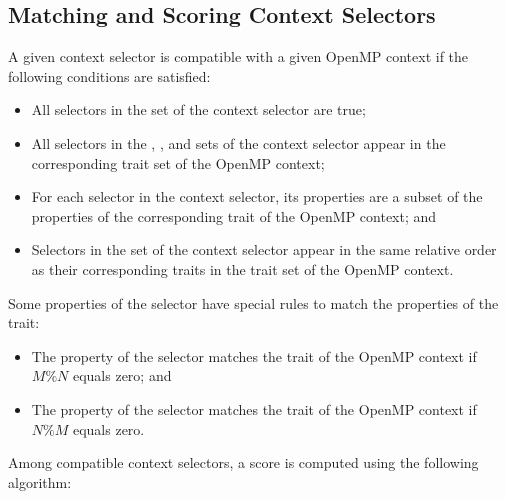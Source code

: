 \subsection{Matching and Scoring Context Selectors}
\label{subsec:Matching and Scoring Context Selectors}

A given context selector is compatible with a given OpenMP context if the
following conditions are satisfied:

\begin{itemize}
\item All selectors in the  set of the context selector are true;
\item All selectors in the , , and  
      sets of the context selector appear in the corresponding trait set of the 
      OpenMP context;
\item For each selector in the context selector, its properties are a subset of 
      the properties of the corresponding trait of the OpenMP context; and
\item Selectors in the  set of the context selector appear 
      in the same relative order as their corresponding traits in the 
       trait set of the OpenMP context.
\end{itemize}

Some properties of the  selector have special rules to match the 
properties of the  trait:

\begin{itemize}
\item The \code{)} property of the selector matches the
       trait of the OpenMP context if $M \% N$ equals zero; and
\item The \code{)} property of the selector matches 
      the  trait of the OpenMP context if $N \% M$ equals zero.
\end{itemize}

Among compatible context selectors, a score is computed using the following algorithm:

